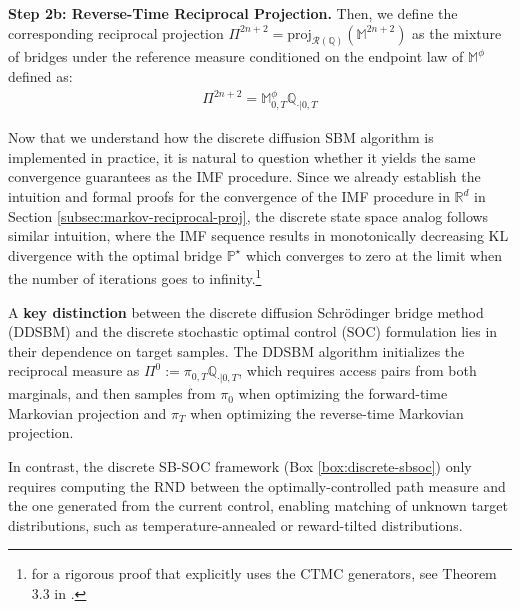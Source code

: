 \documentclass{article}
\begin{document}
\textbf{Step 2b: Reverse-Time Reciprocal Projection.}
Then, we define the corresponding reciprocal projection $\Pi^{2n+2}=\text{proj}_{\mathcal{R}(\mathbb{Q})}(\mathbb{M}^{2n+2})$ as the mixture of bridges under the reference measure conditioned on the endpoint law of $\mathbb{M}^\phi$ defined as:
\begin{align}
    \Pi^{2n+2}=\mathbb{M}^\phi_{0,T}\mathbb{Q}_{\cdot|0,T}
\end{align}

Now that we understand how the discrete diffusion SBM algorithm is implemented in practice, it is natural to question whether it yields the same convergence guarantees as the IMF procedure. Since we already establish the intuition and formal proofs for the convergence of the IMF procedure in $\mathbb{R}^d$ in Section \ref{subsec:markov-reciprocal-proj}, the discrete state space analog follows similar intuition, where the IMF sequence results in monotonically decreasing KL divergence with the optimal bridge $\mathbb{P}^\star$ which converges to zero at the limit when the number of iterations goes to infinity.\footnote{for a rigorous proof that explicitly uses the CTMC generators, see Theorem 3.3 in \citep{kim2024discrete}.}

\begin{remark}
    A \textbf{key distinction} between the discrete diffusion Schrödinger bridge method (DDSBM) and the discrete stochastic optimal control (SOC) formulation lies in their dependence on target samples. The DDSBM algorithm initializes the reciprocal measure as $\Pi^0:= \pi_{0,T}\mathbb{Q}_{\cdot|0,T}$, which requires access pairs from both marginals, and then samples from $\pi_0$ when optimizing the forward-time Markovian projection and $\pi_T$ when optimizing the reverse-time Markovian projection. 
    
    In contrast, the discrete SB-SOC framework (Box \ref{box:discrete-sbsoc}) only requires computing the RND between the optimally-controlled path measure and the one generated from the current control, enabling matching of unknown target distributions, such as temperature-annealed or reward-tilted distributions. 
\end{remark}
\end{document}

